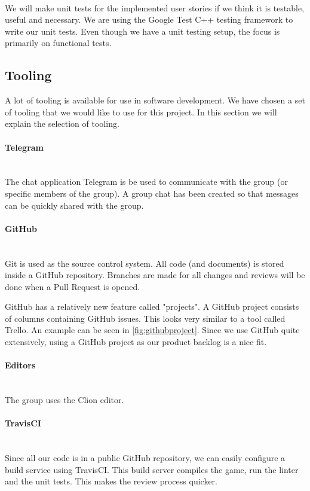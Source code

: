 ~\\

We will make unit tests for the implemented user stories if we think it is testable, useful and necessary. We are using the Google Test C++ testing framework to write our unit tests. Even though we have a unit testing setup, the focus is primarily on functional tests.

\subsection{Tooling}
A lot of tooling is available for use in software development. We have chosen a set of tooling that we would like to use for this project. In this section we will explain the selection of tooling.

\paragraph{Telegram}
~\\ The chat application Telegram is be used to communicate with the group (or specific members of the group). A group chat has been created so that messages can be quickly shared with the group.

\paragraph{GitHub}
~\\ Git is used as the source control system. All code (and documents) is stored inside a GitHub repository. Branches are made for all changes and reviews will be done when a Pull Request is opened.

GitHub has a relatively new feature called "projects". A GitHub project consists of columns containing GitHub issues. This looks very similar to a tool called Trello. An example can be seen in \cref{fig:githubproject}. Since we use GitHub quite extensively, using a GitHub project as our product backlog is a nice fit.

\paragraph{Editors}
~\\ The group uses the Clion editor. 

\paragraph{TravisCI}
~\\ Since all our code is in a public GitHub repository, we can easily configure a build service using TravisCI. This build server compiles the game, run the linter and the unit tests. This makes the review process quicker.

